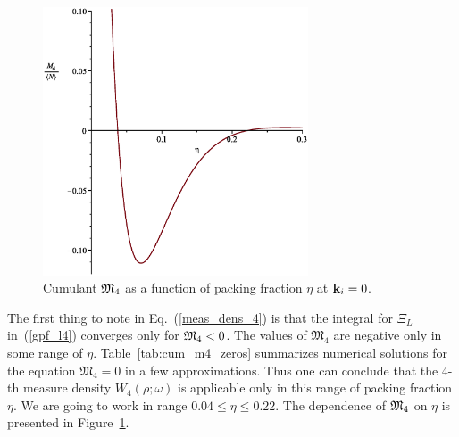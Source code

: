 \begin{figure}[htbp]
	\includegraphics[width=0.7\textwidth,angle=0]{M4_at_k_equals_0_as_function_of_eta}
	\caption{Cumulant $\frak M_4$ as a function of packing fraction $\eta$ at $\vb k_i = 0$.}
	\label{m4_fig1}
\end{figure}

The first thing to note in Eq.~(\ref{meas_dens_4}) is that the integral for $\Xi_L$ in~(\ref{gpf_l4}) converges only for $\frak M_4 < 0$. The values of $\mathfrak M_4$ are negative only in some range of $\eta$. Table~{\ref{tab:cum_m4_zeros}} summarizes numerical solutions for the equation $\mathfrak{M_4}=0$ in a few approximations. Thus one can conclude that the 4-th measure density $W_4(\rho; \omega)$ is applicable only in this range of packing fraction $\eta$. We are going to work in range $0.04 \le \eta \le 0.22$. The dependence of $\frak M_4$ on $\eta$ is presented in Figure~\ref{m4_fig1}.

